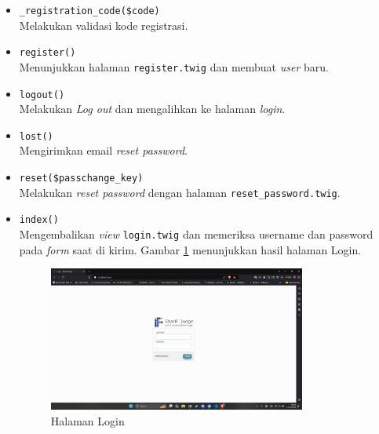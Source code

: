 \documentclass[a4paper,twoside]{article}
\begin{document}
\begin{enumerate}
\begin{itemize}
\begin{itemize}
			                  \begin{itemize}
				                  \item \verb|_registration_code($code)| \\
				                        Melakukan validasi kode registrasi.
				                  \item \verb|register()| \\
				                        Menunjukkan halaman \verb|register.twig| dan membuat \textit{user} baru.
				                  \item \verb|logout()| \\
				                        Melakukan \textit{Log out} dan mengalihkan ke halaman \textit{login}.
				                  \item \verb|lost()| \\
				                        Mengirimkan email \textit{reset password}.
				                  \item \verb|reset($passchange_key)| \\
				                        Melakukan \textit{reset password} dengan halaman \verb|reset_password.twig|.
				                  \item \verb|index()| \\
				                        Mengembalikan \textit{view} \verb|login.twig| dan memeriksa username dan password pada \textit{form} saat di kirim. Gambar \ref{fig:3:1:1:login} menunjukkan hasil halaman Login.

				                        \begin{figure}[H]
					                        \centering
					                        \includegraphics[width=0.8\textwidth]{views/login.png}
					                        \caption{Halaman Login}
					                        \label{fig:3:1:1:login}
				                        \end{figure}

			                  \end{itemize}


\end{itemize}
\end{itemize}
\end{enumerate}
\end{document}
